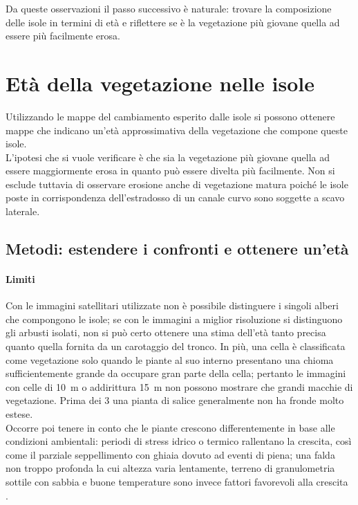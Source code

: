 

Da queste osservazioni il passo successivo è naturale: trovare la composizione delle isole in termini di età e riflettere se è la vegetazione più giovane quella ad essere più facilmente erosa.




\section{Età della vegetazione nelle isole}
Utilizzando le mappe del cambiamento esperito dalle isole si possono ottenere mappe che indicano un'età approssimativa della vegetazione che compone queste isole. 
\\
L'ipotesi che si vuole verificare è che sia la vegetazione più giovane quella ad essere maggiormente erosa in quanto può essere divelta più facilmente.
Non si esclude tuttavia di osservare erosione anche di vegetazione matura poiché le isole poste in corrispondenza dell'estradosso di un canale curvo sono soggette a scavo laterale.

\subsection{Metodi: estendere i confronti e ottenere un'età}
\paragraph{Limiti}
Con le immagini satellitari utilizzate non è possibile distinguere i singoli alberi che compongono le isole; se con le immagini a miglior risoluzione si distinguono gli arbusti isolati, non si può certo ottenere una stima dell'età tanto precisa quanto quella fornita da un carotaggio del tronco.
In più, una cella è classificata come vegetazione solo quando le piante al suo interno presentano una chioma sufficientemente grande da occupare gran parte della cella; pertanto le immagini con celle di \SI{10}{\m} o addirittura \SI{15}{\m} non possono mostrare che grandi macchie di vegetazione.
Prima dei \SI{3}{\anni} una pianta di salice generalmente non ha fronde molto estese.
\\
Occorre poi tenere in conto che le piante crescono differentemente in base alle condizioni ambientali: periodi di stress idrico o termico rallentano la crescita, così come il parziale seppellimento con ghiaia dovuto ad eventi di piena; una falda non troppo profonda la cui altezza varia lentamente, terreno di granulometria sottile con sabbia e buone temperature sono invece fattori favorevoli alla crescita .

